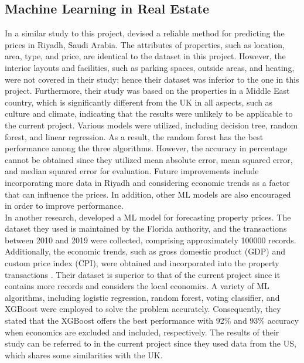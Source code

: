 \documentclass[12pt,twoside]{report}
\begin{document}
\subsection{Machine Learning in Real Estate}
In a similar study to this project, \citet{RN17} devised a reliable method for predicting the prices in Riyadh, Saudi Arabia. The attributes of properties, such as location, area, type, and price, are identical to the dataset in this project. However, the interior layouts and facilities, such as parking spaces, outside areas, and heating, were not covered in their study; hence their dataset was inferior to the one in this project. Furthermore, their study was based on the properties in a Middle East country, which is significantly different from the UK in all aspects, such as culture and climate, indicating that the results were unlikely to be applicable to the current project. Various models were utilized, including decision tree, random forest, and linear regression. As a result, the random forest has the best performance among the three algorithms. However, the accuracy in percentage cannot be obtained since they utilized mean absolute error, mean squared error, and median squared error for evaluation. Future improvements include incorporating more data in Riyadh and considering economic trends as a factor that can influence the prices. In addition, other ML models are also encouraged in order to improve performance. 
\\

In another research, \citet{RN20} developed a ML model for forecasting property prices. The dataset they used is maintained by the Florida authority, and the transactions between 2010 and 2019 were collected, comprising approximately 100000 records. Additionally, the economic trends, such as gross domestic product (GDP) and custom price index (CPI), were obtained and incorporated into the property transactions \cite{RN20}. Their dataset is superior to that of the current project since it contains more records and considers the local economics. A variety of ML algorithms, including logistic regression, random forest, voting classifier, and XGBoost were employed to solve the problem accurately. Consequently, they stated that the XGBoost offers the best performance with 92\% and 93\% accuracy when economics are excluded and included, respectively. The results of their study can be referred to in the current project since they used data from the US, which shares some similarities with the UK.
\\
\end{document}
